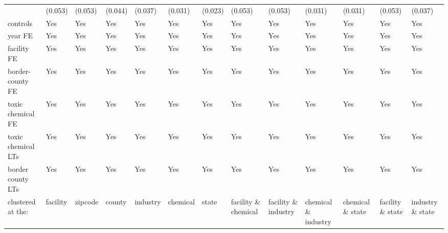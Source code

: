 \begin{table}[H]
{\begin{tabular}{@{}lllllllllllll@{}}
            & (0.053)   & (0.053)   & (0.044)   & (0.037)   & (0.031)   & (0.023)   & (0.053)              & (0.053)              & (0.031)              & (0.031)          & (0.053)          & (0.037)          \\
            controls                                   & Yes       & Yes       & Yes       & Yes       & Yes       & Yes       & Yes                  & Yes                  & Yes                  & Yes               & Yes               & Yes               \\
            year FE                                    & Yes       & Yes       & Yes       & Yes       & Yes       & Yes       & Yes                  & Yes                  & Yes                  & Yes               & Yes               & Yes               \\
            facility FE                                & Yes       & Yes       & Yes       & Yes       & Yes       & Yes       & Yes                  & Yes                  & Yes                  & Yes               & Yes               & Yes               \\
            border-county FE                           & Yes       & Yes       & Yes       & Yes       & Yes       & Yes       & Yes                  & Yes                  & Yes                  & Yes               & Yes               & Yes               \\
            toxic chemical FE                          & Yes       & Yes       & Yes       & Yes       & Yes       & Yes       & Yes                  & Yes                  & Yes                  & Yes               & Yes               & Yes               \\
            toxic chemical LTs                         & Yes       & Yes       & Yes       & Yes       & Yes       & Yes       & Yes                  & Yes                  & Yes                  & Yes               & Yes               & Yes               \\
            border county LTs                          & Yes       & Yes       & Yes       & Yes       & Yes       & Yes       & Yes                  & Yes                  & Yes                  & Yes               & Yes               & Yes               \\\midrule
            clustered at the:                          & facility  & zipcode   & county    & industry  & chemical  & state     & facility \& chemical & facility \& industry & chemical \& industry & chemical \& state & facility \& state & industry \& state \\

\end{tabular}}
\end{table}
